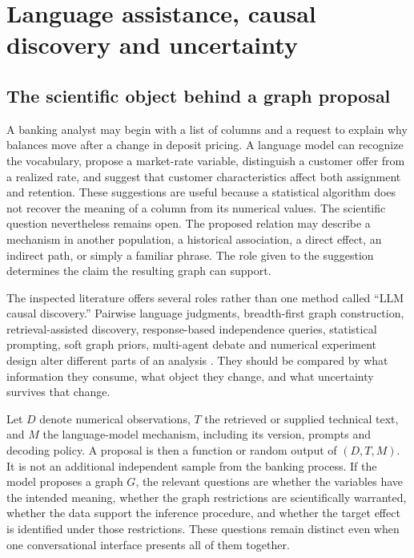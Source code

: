 \chapter{Language assistance, causal discovery and uncertainty}
\label{ch:la03-discovery}

\section{The scientific object behind a graph proposal}

A banking analyst may begin with a list of columns and a request to explain why
balances move after a change in deposit pricing. A language model can recognize
the vocabulary, propose a market-rate variable, distinguish a customer offer
from a realized rate, and suggest that customer characteristics affect both
assignment and retention. These suggestions are useful because a statistical
algorithm does not recover the meaning of a column from its numerical values.
The scientific question nevertheless remains open. The proposed relation may
describe a mechanism in another population, a historical association, a direct
effect, an indirect path, or simply a familiar phrase. The role given to the
suggestion determines the claim the resulting graph can support.

The inspected literature offers several roles rather than one method called
``LLM causal discovery.'' Pairwise language judgments, breadth-first graph
construction, retrieval-assisted discovery, response-based independence
queries, statistical prompting, soft graph priors, multi-agent debate and
numerical experiment design alter different parts of an analysis
\cite{v12_la_2305_00050,v12_la_2402_01207,v12_la_2402_15301,
v12_la_2406_07378,v12_la_2402_01454,v12_la_2405_13551,
v12_la_2407_15073,v12_la_2608_09696}.
They should be compared by what information they consume, what object they
change, and what uncertainty survives that change.

Let $D$ denote numerical observations, $T$ the retrieved or supplied technical
text, and $M$ the language-model mechanism, including its version, prompts and
decoding policy. A proposal is then a function or random output of
$(D,T,M)$. It is not an additional independent sample from the banking process.
If the model proposes a graph $G$, the relevant questions are whether the
variables have the intended meaning, whether the graph restrictions are
scientifically warranted, whether the data support the inference procedure,
and whether the target effect is identified under those restrictions. These
questions remain distinct even when one conversational interface presents all
of them together.

